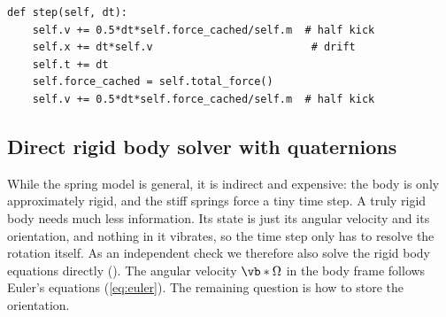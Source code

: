 \medskip\noindent\begin{minipage}{\linewidth}
\begin{verbatim}
def step(self, dt):
    self.v += 0.5*dt*self.force_cached/self.m  # half kick
    self.x += dt*self.v                         # drift
    self.t += dt
    self.force_cached = self.total_force()
    self.v += 0.5*dt*self.force_cached/self.m  # half kick
\end{verbatim}
\label{lst:verlet}
\end{minipage}\par\medskip

\subsection{Direct rigid body solver with quaternions}
\label{sec:quaternions}
While the spring model is general, it is indirect and expensive: the body is only approximately rigid, and the stiff springs force a tiny time step.
A truly rigid body needs much less information.
Its state is just its angular velocity and its orientation, and nothing in it vibrates, so the time step only has to resolve the rotation itself.
As an independent check we therefore also solve the rigid body equations directly ().
The angular velocity $\vb*{\Omega}$ in the body frame follows Euler's equations (\cref{eq:euler}).
The remaining question is how to store the orientation.

